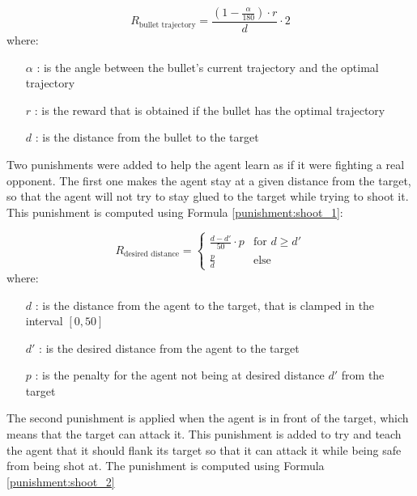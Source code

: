 \begin{equation} \label{bullet:1}
    R_\text{bullet trajectory} = \frac{(1 - \frac{\alpha}{180}) \cdot r}{d} \cdot 2
\end{equation}
where:
\begin{itemize}
    \item [$\alpha$]: is the angle between the bullet's current trajectory and the optimal trajectory
    \item [$r$]: is the reward that is obtained if the bullet has the optimal trajectory
    \item [$d$]: is the distance from the bullet to the target
\end{itemize}

Two punishments were added to help the agent learn as if it were fighting a real opponent. The first one makes the agent stay at a given distance from the target, so that the agent will not try to stay glued to the target while trying to shoot it. This punishment is computed using Formula \ref{punishment:shoot_1}:

\begin{equation} \label{punishment:shoot_1}
    R_\text{desired distance} = \begin{cases}
        \frac{d - d'}{50} \cdot p & \text{for } d \geq d' \\
        \frac{p}{d} & \text{else}
    \end{cases}
\end{equation}
where:
\begin{itemize}
    \item [$d$]: is the distance from the agent to the target, that is clamped in the interval $[0, 50]$
    \item [$d'$]: is the desired distance from the agent to the target
    \item [$p$]: is the penalty for the agent not being at desired distance $d'$ from the target
\end{itemize}

The second punishment is applied when the agent is in front of the target, which means that the target can attack it. This punishment is added to try and teach the agent that it should flank its target so that it can attack it while being safe from being shot at. The punishment is computed using Formula \ref{punishment:shoot_2}

